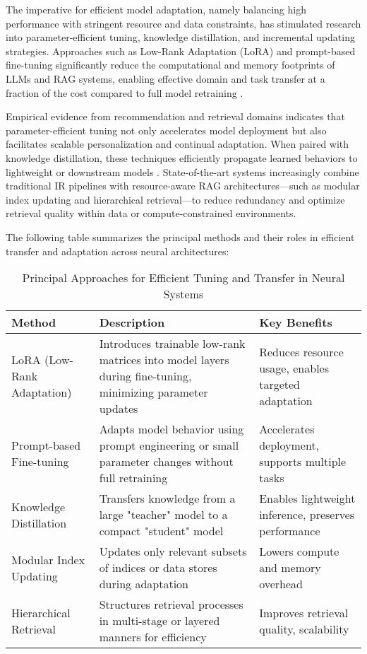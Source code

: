 \documentclass[sigconf]{acmart}
\begin{document}
The imperative for efficient model adaptation, namely balancing high performance with stringent resource and data constraints, has stimulated research into parameter-efficient tuning, knowledge distillation, and incremental updating strategies. Approaches such as Low-Rank Adaptation (LoRA) and prompt-based fine-tuning significantly reduce the computational and memory footprints of LLMs and RAG systems, enabling effective domain and task transfer at a fraction of the cost compared to full model retraining \cite{ref32, ref33, ref55, ref61}.

Empirical evidence from recommendation and retrieval domains indicates that parameter-efficient tuning not only accelerates model deployment but also facilitates scalable personalization and continual adaptation. When paired with knowledge distillation, these techniques efficiently propagate learned behaviors to lightweight or downstream models \cite{ref55}. State-of-the-art systems increasingly combine traditional IR pipelines with resource-aware RAG architectures—such as modular index updating and hierarchical retrieval—to reduce redundancy and optimize retrieval quality within data or compute-constrained environments.

The following table summarizes the principal methods and their roles in efficient transfer and adaptation across neural architectures:

\begin{table*}[htbp]
\centering
\caption{Principal Approaches for Efficient Tuning and Transfer in Neural Systems}
\label{tab:efficient_transfer}
\begin{adjustbox}{max width=\textwidth}
\begin{tabular}{lll}
\toprule
\textbf{Method} & \textbf{Description} & \textbf{Key Benefits} \\
\midrule
LoRA (Low-Rank Adaptation) & Introduces trainable low-rank matrices into model layers during fine-tuning, minimizing parameter updates & Reduces resource usage, enables targeted adaptation \\
Prompt-based Fine-tuning & Adapts model behavior using prompt engineering or small parameter changes without full retraining & Accelerates deployment, supports multiple tasks \\
Knowledge Distillation & Transfers knowledge from a large "teacher" model to a compact "student" model & Enables lightweight inference, preserves performance \\
Modular Index Updating & Updates only relevant subsets of indices or data stores during adaptation & Lowers compute and memory overhead \\
Hierarchical Retrieval & Structures retrieval processes in multi-stage or layered manners for efficiency & Improves retrieval quality, scalability \\
\bottomrule
\end{tabular}
\end{adjustbox}
\end{table*}
\end{document}
